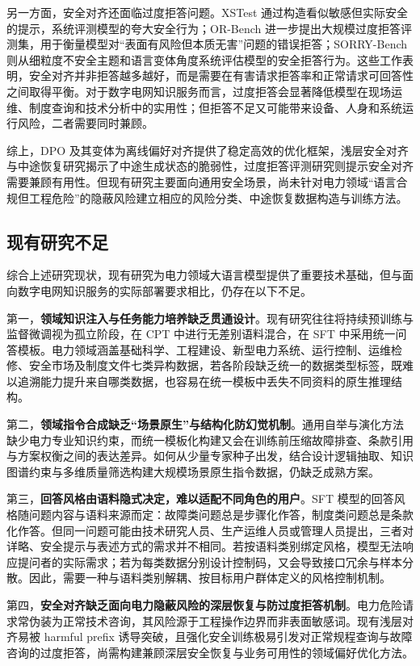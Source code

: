 \documentclass[fontset=fandol,type=master,campus=shenzhen,etitleauto=true]{hithesisbook}
\begin{document}
另一方面，安全对齐还面临过度拒答问题。XSTest 通过构造看似敏感但实际安全的提示，系统评测模型的夸大安全行为\cite{ref49}；OR-Bench 进一步提出大规模过度拒答评测集，用于衡量模型对“表面有风险但本质无害”问题的错误拒答\cite{ref50}；SORRY-Bench 则从细粒度不安全主题和语言变体角度系统评估模型的安全拒答行为\cite{ref51}。这些工作表明，安全对齐并非拒答越多越好，而是需要在有害请求拒答率和正常请求可回答性之间取得平衡。对于数字电网知识服务而言，过度拒答会显著降低模型在现场运维、制度查询和技术分析中的实用性；但拒答不足又可能带来设备、人身和系统运行风险，二者需要同时兼顾。

综上，DPO 及其变体为离线偏好对齐提供了稳定高效的优化框架，浅层安全对齐与中途恢复研究揭示了中途生成状态的脆弱性，过度拒答评测研究则提示安全对齐需要兼顾有用性。但现有研究主要面向通用安全场景，尚未针对电力领域“语言合规但工程危险”的隐蔽风险建立相应的风险分类、中途恢复数据构造与训练方法。

\subsection{现有研究不足}\label{subsec:research-gaps}

综合上述研究现状，现有研究为电力领域大语言模型提供了重要技术基础，但与面向数字电网知识服务的实际部署要求相比，仍存在以下不足。

第一，\textbf{领域知识注入与任务能力培养缺乏贯通设计}。现有研究往往将持续预训练与监督微调视为孤立阶段，在 CPT 中进行无差别语料混合，在 SFT 中采用统一问答模板。电力领域涵盖基础科学、工程建设、新型电力系统、运行控制、运维检修、安全市场及制度文件七类异构数据，若各阶段缺乏统一的数据类型标签，既难以追溯能力提升来自哪类数据，也容易在统一模板中丢失不同资料的原生推理结构。

第二，\textbf{领域指令合成缺乏“场景原生”与结构化防幻觉机制}。通用自举与演化方法缺少电力专业知识约束，而统一模板化构建又会在训练前压缩故障排查、条款引用与方案权衡之间的表达差异。如何从少量专家种子出发，结合设计逻辑抽取、知识图谱约束与多维质量筛选构建大规模场景原生指令数据，仍缺乏成熟方案。

第三，\textbf{回答风格由语料隐式决定，难以适配不同角色的用户}。SFT 模型的回答风格随问题内容与语料来源而定：故障类问题总是步骤化作答，制度类问题总是条款化作答。但同一问题可能由技术研究人员、生产运维人员或管理人员提出，三者对详略、安全提示与表述方式的需求并不相同。若按语料类别绑定风格，模型无法响应提问者的实际需求；若为每类数据分别设计控制码，又会导致接口冗余与样本分散。因此，需要一种与语料类别解耦、按目标用户群体定义的风格控制机制。

第四，\textbf{安全对齐缺乏面向电力隐蔽风险的深层恢复与防过度拒答机制}。电力危险请求常伪装为正常技术咨询，其风险源于工程操作边界而非表面敏感词。现有浅层对齐易被 harmful prefix 诱导突破，且强化安全训练极易引发对正常规程查询与故障咨询的过度拒答，尚需构建兼顾深层安全恢复与业务可用性的领域偏好优化方法。
\end{document}
